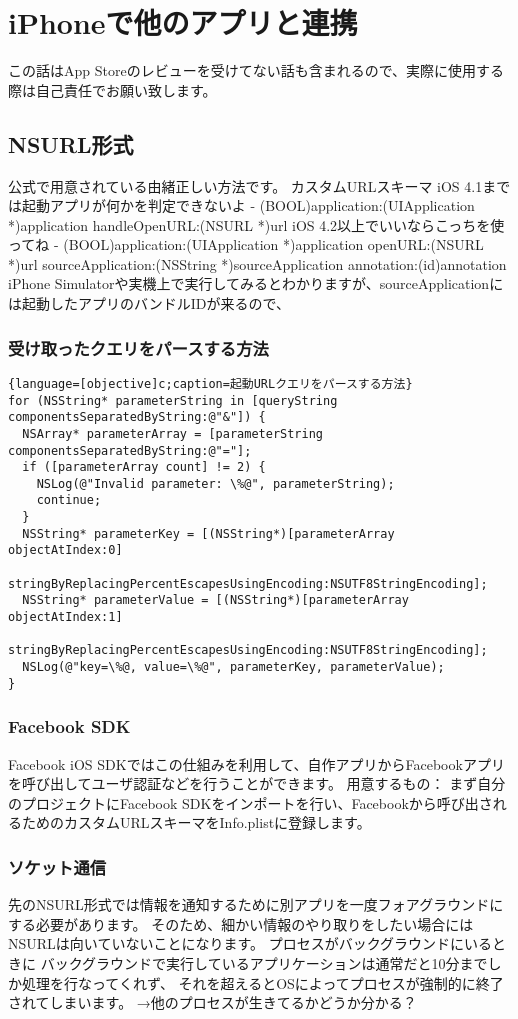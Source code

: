 \documentclass{jsarticle}
\begin{document}
\section{iPhoneで他のアプリと連携}
この話はApp Storeのレビューを受けてない話も含まれるので、実際に使用する際は自己責任でお願い致します。

\subsection{NSURL形式}
公式で用意されている由緒正しい方法です。
カスタムURLスキーマ
iOS 4.1までは起動アプリが何かを判定できないよ
- (BOOL)application:(UIApplication *)application handleOpenURL:(NSURL *)url
iOS 4.2以上でいいならこっちを使ってね
- (BOOL)application:(UIApplication *)application openURL:(NSURL *)url sourceApplication:(NSString *)sourceApplication annotation:(id)annotation
iPhone Simulatorや実機上で実行してみるとわかりますが、sourceApplicationには起動したアプリのバンドルIDが来るので、

\subsubsection{受け取ったクエリをパースする方法}
\begin{lstlisting}{language=[objective]c;caption=起動URLクエリをパースする方法}
for (NSString* parameterString in [queryString componentsSeparatedByString:@"&"]) {
  NSArray* parameterArray = [parameterString componentsSeparatedByString:@"="];
  if ([parameterArray count] != 2) {
	NSLog(@"Invalid parameter: \%@", parameterString);
	continue;
  }
  NSString* parameterKey = [(NSString*)[parameterArray objectAtIndex:0]
	stringByReplacingPercentEscapesUsingEncoding:NSUTF8StringEncoding];
  NSString* parameterValue = [(NSString*)[parameterArray objectAtIndex:1]
	stringByReplacingPercentEscapesUsingEncoding:NSUTF8StringEncoding];
  NSLog(@"key=\%@, value=\%@", parameterKey, parameterValue);
}
\end{lstlisting}
\subsubsection{Facebook SDK}
Facebook iOS SDKではこの仕組みを利用して、自作アプリからFacebookアプリを呼び出してユーザ認証などを行うことができます。
用意するもの：
まず自分のプロジェクトにFacebook SDKをインポートを行い、Facebookから呼び出されるためのカスタムURLスキーマをInfo.plistに登録します。

\subsubsection{ソケット通信}
先のNSURL形式では情報を通知するために別アプリを一度フォアグラウンドにする必要があります。
そのため、細かい情報のやり取りをしたい場合にはNSURLは向いていないことになります。
プロセスがバックグラウンドにいるときに
バックグラウンドで実行しているアプリケーションは通常だと10分までしか処理を行なってくれず、
それを超えるとOSによってプロセスが強制的に終了されてしまいます。
→他のプロセスが生きてるかどうか分かる？
\end{document}
